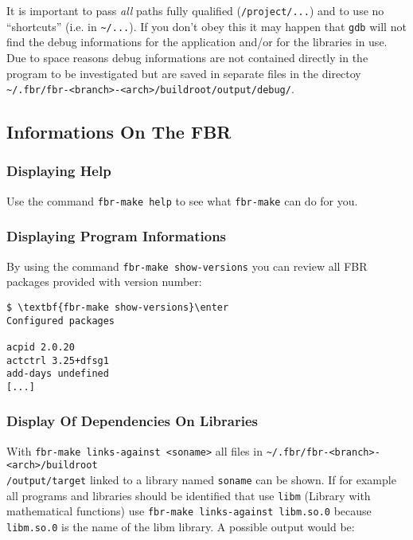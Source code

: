 It is important to pass \emph{all} paths fully qualified
(\texttt{/project/...}) and to use no ``shortcuts'' (i.e. in
\texttt{\~{}/...}). If you don't obey this it may happen that \texttt{gdb}
will not find the debug informations for the application and/or for the libraries
in use. Due to space reasons debug informations are not contained directly
in the program to be investigated but are saved in separate files in the directoy
\texttt{\~{}/.fbr/fbr-<branch>-<arch>/buildroot/output/debug/}.

\subsection{Informations On The FBR}

\subsubsection{Displaying Help}

Use the command \texttt{fbr-make help} to see what \texttt{fbr-make} can do for you.

\subsubsection{Displaying Program Informations}

By using the command \texttt{fbr-make show-versions} you can review all
FBR packages provided with version number:

\begin{example}
\begin{Verbatim}[commandchars=\\\{\}]
$ \textbf{fbr-make show-versions}\enter
Configured packages

acpid 2.0.20
actctrl 3.25+dfsg1
add-days undefined
[...]
\end{Verbatim}
\end{example}

\subsubsection{Display Of Dependencies On Libraries}

With \texttt{fbr-make links-against <soname>} all files in
\texttt{\~{}/.fbr/fbr-<branch>-<arch>/buildroot\\/output/target}
linked to a library named \texttt{soname} can be shown. If for example all
programs and libraries should be identified that use \texttt{libm} (Library
with mathematical functions) use \texttt{fbr-make links-against libm.so.0}
because \texttt{libm.so.0} is the name of the libm library.
A possible output would be:

